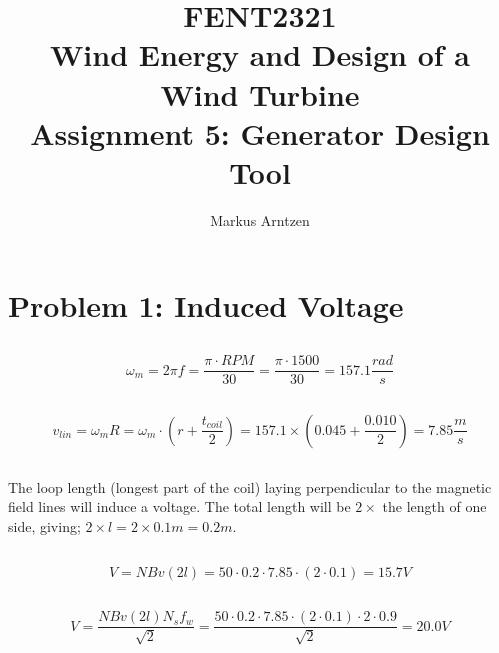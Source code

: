 \documentclass[11pt,a4paper]{article}
\title{
    \textbf{FENT2321}\\[0.3cm]
    Wind Energy and Design of a Wind Turbine\\[0.5cm]
    \Large Assignment 5: Generator Design Tool
}
\author{Markus Arntzen}
\date{}
\begin{document}
\maketitle
\thispagestyle{empty}

\clearpage
\tableofcontents
\clearpage

\section{Problem 1: Induced Voltage}

\subsection{}
\begin{equation}
    \omega_m = 2\pi f = \frac{\pi \cdot RPM}{30} = \frac{\pi \cdot 1500}{30} = 157.1\frac{rad}{s}
\end{equation}

\subsection{}
\begin{equation}
    v_{lin} = \omega_m R = \omega_m \cdot (r + \frac{t_{coil}}{2}) =
    157.1 \times \left(0.045 + \frac{0.010}{2}\right) = 7.85 \frac{m}{s}
\end{equation}

\subsection{}
The loop length (longest part of the coil) laying perpendicular to the magnetic field lines
will induce a voltage. The total length will be $2\times$ the length of one side, giving;
$2\times l = 2\times 0.1m = 0.2m$.

\subsection{}
\begin{equation}
    V = NBv(2l) = 50\cdot0.2\cdot7.85\cdot(2\cdot0.1) = 15.7V
\end{equation}

\subsection{}
\begin{equation}
    V = \frac{NBv(2l)N_sf_w}{\sqrt{2}} = \frac{50\cdot0.2\cdot7.85\cdot(2\cdot0.1)\cdot2\cdot0.9}{\sqrt{2}} = 20.0V
\end{equation}
\end{document}
